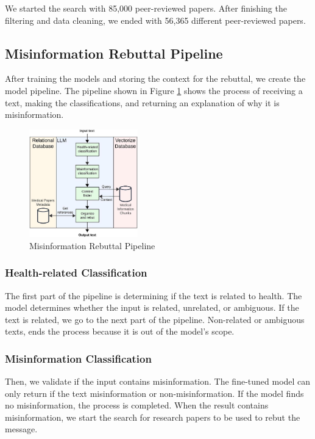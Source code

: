 We started the search with 85,000 peer-reviewed papers. After finishing the filtering and data cleaning, we ended with 56,365 different peer-reviewed papers. 



\subsection{Misinformation Rebuttal Pipeline}
After training the models and storing the context for the rebuttal, we create the model pipeline. The pipeline shown in Figure \ref{fig:llm} shows the process of receiving a text, making the classifications, and returning an explanation of why it is misinformation.

\begin{figure}[htbp]
	\begin{center}
		\includegraphics[width=0.42\textwidth]{figures/LLM_Pipeline.jpeg} %
	\end{center}
	\caption{Misinformation Rebuttal Pipeline} %
	\label{fig:llm}
\end{figure}


\subsubsection{Health-related Classification}
The first part of the pipeline is determining if the text is related to health. The model determines whether the input is related, unrelated, or ambiguous.
If the text is related, we go to the next part of the pipeline. Non-related or ambiguous texts, ends the process because it is out of the model's scope. 

\subsubsection{Misinformation Classification}
Then, we validate if the input contains misinformation. The fine-tuned model can only return if the text misinformation or non-misinformation. If the model finds no misinformation, the process is completed. When the result contains misinformation, we start the search for research papers to be used to rebut the message.

